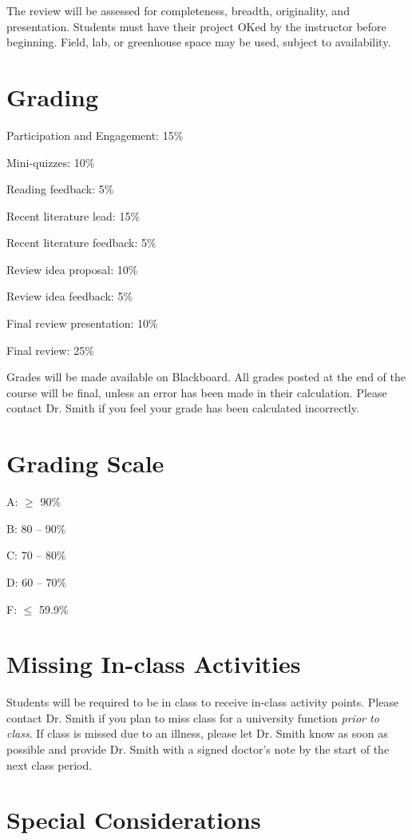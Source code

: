 \documentclass[12pt, notitlepage]{article}   	%
\begin{document}
{The review will be assessed for completeness, breadth, originality, and presentation.
Students must have their project OKed by the instructor before beginning. Field, lab,
or greenhouse space may be used, subject to availability.

\newpage

\section{Grading}
Participation and Engagement: 15\% \par
Mini-quizzes: 10\% \par
Reading feedback: 5\% \par
Recent literature lead: 15\% \par
Recent literature feedback: 5\% \par
Review idea proposal: 10\% \par
Review idea feedback: 5\% \par
Final review presentation: 10\% \par
Final review: 25\% \par

Grades will be made available on Blackboard. 
All grades posted at the end of the course will be final, 
unless an error has been made in their calculation.
Please contact Dr. Smith if you feel your grade has been calculated incorrectly.

\section{Grading Scale}
A: $\geq$ 90\% \par
B: 80 – 90\% \par
C: 70 – 80\% \par
D: 60 – 70\% \par
F: $\leq$ 59.9\% \par

\section{Missing In-class Activities}
Students will be required to be in class to receive in-class activity points. 
Please contact Dr. Smith if you plan to miss class for a university function 
\textit{prior to class}. If class is missed due to an illness, 
please let Dr. Smith know as soon as possible and provide Dr. Smith with 
a signed doctor’s note by the start of the next class period.

\section{Special Considerations}
}
\end{document}
